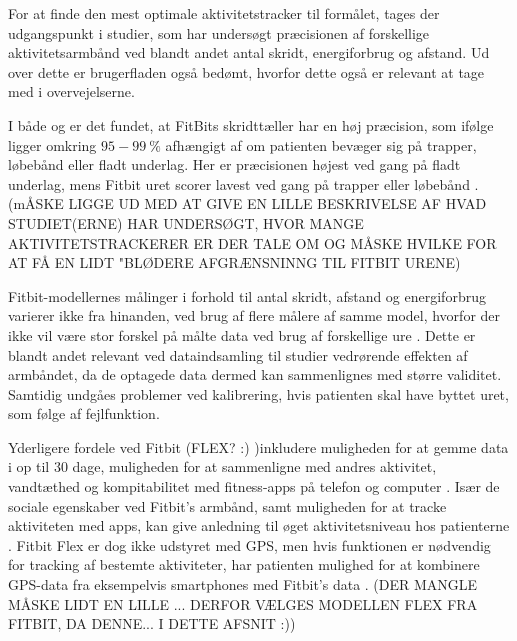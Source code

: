 For at finde den mest optimale aktivitetstracker til formålet, tages der udgangspunkt i studier, som har undersøgt præcisionen af forskellige aktivitetsarmbånd ved blandt andet antal skridt, energiforbrug og afstand. Ud over dette er brugerfladen også bedømt, hvorfor dette også er relevant at tage med i overvejelserne.

I både \citep{evenson2015} og \citep{kaewkannate2016} er det fundet, at FitBits skridttæller har en høj præcision, som ifølge \citep{kaewkannate2016} ligger omkring  $95-99~\%$ afhængigt af om patienten bevæger sig på trapper, løbebånd eller fladt underlag. Her er præcisionen højest ved gang på fladt underlag, mens Fitbit uret scorer lavest ved gang på trapper eller løbebånd \citep{kaewkannate2016}.  (mÅSKE LIGGE UD MED AT GIVE EN LILLE BESKRIVELSE AF HVAD STUDIET(ERNE) HAR UNDERSØGT, HVOR MANGE AKTIVITETSTRACKERER ER DER TALE OM OG MÅSKE HVILKE FOR AT FÅ EN LIDT "BLØDERE AFGRÆNSNINNG TIL FITBIT URENE)

Fitbit-modellernes målinger i forhold til antal skridt, afstand og energiforbrug varierer ikke fra hinanden, ved brug af flere målere af samme model, hvorfor der ikke vil være stor forskel på målte data ved brug af forskellige ure \citep{evenson2015}. Dette er blandt andet relevant ved dataindsamling til studier vedrørende effekten af armbåndet, da de optagede data dermed kan sammenlignes med større validitet. Samtidig undgåes problemer ved kalibrering, hvis patienten skal have byttet uret, som følge af fejlfunktion.

Yderligere fordele ved Fitbit (FLEX? :) )inkludere muligheden for at gemme data i op til $30$ dage, muligheden for at sammenligne med andres aktivitet, vandtæthed og kompitabilitet med fitness-apps på telefon og computer \citep{kaewkannate2016, fitbitflex}. Især de sociale egenskaber ved Fitbit's armbånd, samt muligheden for at tracke aktiviteten med apps, kan give anledning til øget aktivitetsniveau hos patienterne \citep{karapanos2016, rooksby2014}. Fitbit Flex er dog ikke udstyret med GPS, men hvis funktionen er nødvendig for tracking af bestemte aktiviteter, har patienten mulighed for at kombinere GPS-data fra eksempelvis smartphones med Fitbit's data \citep{fitbitflex}. (DER MANGLE MÅSKE LIDT EN LILLE ... DERFOR VÆLGES MODELLEN FLEX FRA FITBIT, DA DENNE... I DETTE AFSNIT :))